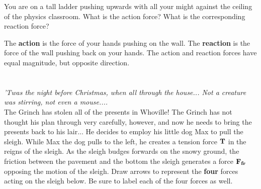 \documentclass[11pt,addpoints,letterpaper]{exam}
\begin{document}
\begin{questions}

\question[3] You are on a tall ladder pushing upwards with all your might against the ceiling of the physics classroom. What is the action force? What is the corresponding reaction force?
\begin{solution}[1cm]
The \textbf{action} is the force of your hands pushing on the wall. The \textbf{reaction} is the force of the wall pushing back on your hands. The action and reaction forces have equal magnitude, but opposite direction. 
\end{solution}


\clearpage

\section*{\small {}}
\textit{'Twas the night before Christmas, when all through the house... Not a creature was stirring, not even a mouse....}\\
The Grinch has stolen all of the presents in Whoville! The Grinch has not thought his plan through very carefully, however, and now he needs to bring the presents back to his lair... He decides to employ his little dog Max to pull the sleigh. 
\question[2] While Max the dog pulls to the left, he creates a tension force $\vb{T}$ in the reigns of the sleigh. As the sleigh budges forwards on the snowy ground, the friction between the pavement and the bottom the sleigh generates a force $\vb{F_{fr}}$ opposing the motion of the sleigh. Draw arrows to represent the \textbf{four} forces acting on the sleigh below. Be sure to label each of the four forces as well. 


\end{questions}
\end{document}
